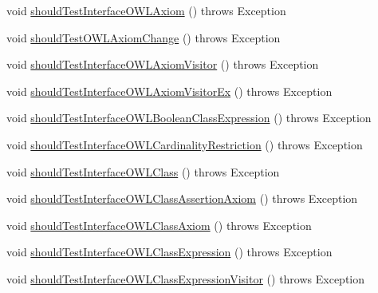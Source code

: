 \begin{DoxyCompactItemize}
\item 
void \hyperlink{classorg_1_1semanticweb_1_1owlapi_1_1contract_1_1_contract_owlapi_model__1_test_a28530a7a00a07cea753f2f6b47d0f2a5}{should\-Test\-Interface\-O\-W\-L\-Axiom} ()  throws Exception 
\item 
void \hyperlink{classorg_1_1semanticweb_1_1owlapi_1_1contract_1_1_contract_owlapi_model__1_test_aff35771fc4f82641187160b8169f6ff9}{should\-Test\-O\-W\-L\-Axiom\-Change} ()  throws Exception 
\item 
void \hyperlink{classorg_1_1semanticweb_1_1owlapi_1_1contract_1_1_contract_owlapi_model__1_test_aa15699761d6f6a56cebfda2e2e123666}{should\-Test\-Interface\-O\-W\-L\-Axiom\-Visitor} ()  throws Exception 
\item 
void \hyperlink{classorg_1_1semanticweb_1_1owlapi_1_1contract_1_1_contract_owlapi_model__1_test_ad49b7dc32ee14e4c45876409c5d323e7}{should\-Test\-Interface\-O\-W\-L\-Axiom\-Visitor\-Ex} ()  throws Exception 
\item 
void \hyperlink{classorg_1_1semanticweb_1_1owlapi_1_1contract_1_1_contract_owlapi_model__1_test_aabbd903bd21d8756dfafb2fe9ed77a46}{should\-Test\-Interface\-O\-W\-L\-Boolean\-Class\-Expression} ()  throws Exception 
\item 
void \hyperlink{classorg_1_1semanticweb_1_1owlapi_1_1contract_1_1_contract_owlapi_model__1_test_af57045abc85c74b24aa739c56deaa38e}{should\-Test\-Interface\-O\-W\-L\-Cardinality\-Restriction} ()  throws Exception 
\item 
void \hyperlink{classorg_1_1semanticweb_1_1owlapi_1_1contract_1_1_contract_owlapi_model__1_test_a4731b68d615a3d6b87559c2f0c57c0e1}{should\-Test\-Interface\-O\-W\-L\-Class} ()  throws Exception 
\item 
void \hyperlink{classorg_1_1semanticweb_1_1owlapi_1_1contract_1_1_contract_owlapi_model__1_test_a7314faa4a2951fc946aeb00805394e18}{should\-Test\-Interface\-O\-W\-L\-Class\-Assertion\-Axiom} ()  throws Exception 
\item 
void \hyperlink{classorg_1_1semanticweb_1_1owlapi_1_1contract_1_1_contract_owlapi_model__1_test_add292eb3e0a14a42af70f9d003b426e9}{should\-Test\-Interface\-O\-W\-L\-Class\-Axiom} ()  throws Exception 
\item 
void \hyperlink{classorg_1_1semanticweb_1_1owlapi_1_1contract_1_1_contract_owlapi_model__1_test_aefa6a128f95f09a6e41c188e917e0971}{should\-Test\-Interface\-O\-W\-L\-Class\-Expression} ()  throws Exception 
\item 
void \hyperlink{classorg_1_1semanticweb_1_1owlapi_1_1contract_1_1_contract_owlapi_model__1_test_a20147866a21df1e08a4ecaf3f8ae0da5}{should\-Test\-Interface\-O\-W\-L\-Class\-Expression\-Visitor} ()  throws Exception 

\end{DoxyCompactItemize}
